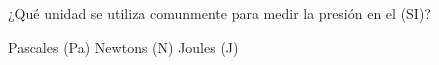 
\question ¿Qué unidad se utiliza comunmente para medir la presión en el
          (SI)?

  \begin{oneparchoices}
    \CorrectChoice Pascales (Pa)
    \choice Newtons (N)
    \choice Joules (J)
  \end{oneparchoices}
